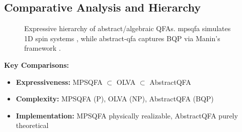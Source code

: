 \subsection*{Comparative Analysis and Hierarchy}
\begin{figure}[h]
\centering
{}
\caption{Expressive hierarchy of abstract/algebraic QFAs. \gls{mpsqfa} simulates 1D spin systems \cite{vidal2003efficient}, while \gls{abstract-qfa} captures BQP via Manin's framework \cite{manin1980computable}.}
\label{fig:abstract-hierarchy}
\end{figure}

\textbf{Key Comparisons:}
\begin{itemize}
    \item \textbf{Expressiveness:} MPSQFA $\subset$ OLVA $\subset$ AbstractQFA
    \item \textbf{Complexity:} MPSQFA (P), OLVA (NP), AbstractQFA (BQP)
    \item \textbf{Implementation:} MPSQFA physically realizable, AbstractQFA purely theoretical
\end{itemize}